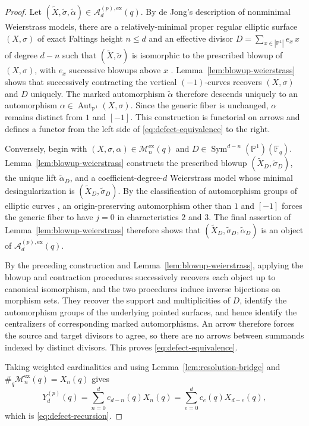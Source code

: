 \documentclass[a4paper,12pt]{amsart}
\theoremstyle{definition}
\newcommand{\cM}{\mathcal{M}}
\newcommand{\Fb}{\mathbb{F}}
\newcommand{\Ac}{\mathcal{A}}
\newcommand{\Pb}{\mathbb{P}}
\newcommand{\Aut}{\operatorname{Aut}}
\newcommand{\Sym}{\operatorname{Sym}}
\begin{document}
\begin{proof}
Let $(\widetilde X,\widetilde\sigma,\widetilde\alpha)\in\Ac_d^{(p),\mathrm{ex}}(q)$.  By de Jong's description of nonminimal Weierstrass models, there are a relatively-minimal proper regular elliptic surface $(X,\sigma)$ of exact Faltings height $n\leq d$ and an effective divisor $D=\sum_{x\in|\Pb^1|}e_x\,x$ of degree $d-n$ such that $(\widetilde X,\widetilde\sigma)$ is isomorphic to the prescribed blowup of $(X,\sigma)$, with $e_x$ successive blowups above $x$ \cite[Section~4.11]{dJ2}.  Lemma~\ref{lem:blowup-weierstrass} shows that successively contracting the vertical $(-1)$-curves recovers $(X,\sigma)$ and $D$ uniquely.  The marked automorphism $\widetilde\alpha$ therefore descends uniquely to an automorphism $\alpha\in\Aut_{\Pb^1}(X,\sigma)$.  Since the generic fiber is unchanged, $\alpha$ remains distinct from $1$ and $[-1]$.  This construction is functorial on arrows and defines a functor from the left side of \eqref{eq:defect-equivalence} to the right.

Conversely, begin with $(X,\sigma,\alpha)\in\cM_n^{\mathrm{ex}}(q)$ and $D\in\Sym^{d-n}(\Pb^1)(\Fb_q)$.  Lemma~\ref{lem:blowup-weierstrass} constructs the prescribed blowup $(\widetilde X_D,\widetilde\sigma_D)$, the unique lift $\widetilde\alpha_D$, and a coefficient-degree-$d$ Weierstrass model whose minimal desingularization is $(\widetilde X_D,\widetilde\sigma_D)$.  By the classification of automorphism groups of elliptic curves \cite[Appendix~A, Proposition~1.2(c)]{Silverman}, an origin-preserving automorphism other than $1$ and $[-1]$ forces the generic fiber to have $j=0$ in characteristics $2$ and $3$.  The final assertion of Lemma~\ref{lem:blowup-weierstrass} therefore shows that $(\widetilde X_D,\widetilde\sigma_D,\widetilde\alpha_D)$ is an object of $\Ac_d^{(p),\mathrm{ex}}(q)$.

By the preceding construction and Lemma~\ref{lem:blowup-weierstrass}, applying the blowup and contraction procedures successively recovers each object up to canonical isomorphism, and the two procedures induce inverse bijections on morphism sets.  They recover the support and multiplicities of $D$, identify the automorphism groups of the underlying pointed surfaces, and hence identify the centralizers of corresponding marked automorphisms.  An arrow therefore forces the source and target divisors to agree, so there are no arrows between summands indexed by distinct divisors.  This proves \eqref{eq:defect-equivalence}.

Taking weighted cardinalities and using Lemma~\ref{lem:resolution-bridge} and $\#_q\cM_n^{\mathrm{ex}}(q)=X_n(q)$ gives
\[
Y_d^{(p)}(q)
=
\sum_{n=0}^{d}c_{d-n}(q)X_n(q)
=
\sum_{e=0}^{d}c_e(q)X_{d-e}(q),
\]
which is \eqref{eq:defect-recursion}.
\end{proof}
\end{document}
